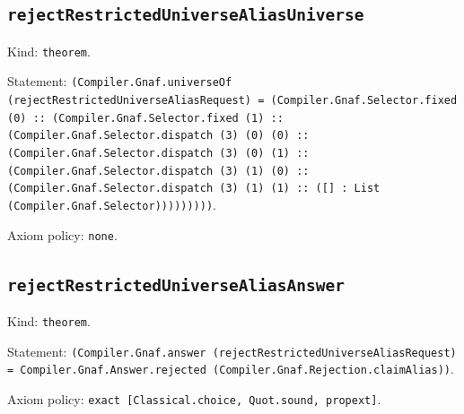 \documentclass[11pt]{article}
\begin{document}
\subsection*{\texttt{rejectRestrictedUniverseAliasUniverse}}
\noindent Kind: \texttt{theorem}.\par
\noindent Statement: \texttt{(Compiler.Gnaf.universeOf (rejectRestrictedUniverseAliasRequest) = (Compiler.Gnaf.Selector.fixed (0) :: (Compiler.Gnaf.Selector.fixed (1) :: (Compiler.Gnaf.Selector.dispatch (3) (0) (0) :: (Compiler.Gnaf.Selector.dispatch (3) (0) (1) :: (Compiler.Gnaf.Selector.dispatch (3) (1) (0) :: (Compiler.Gnaf.Selector.dispatch (3) (1) (1) :: ([] : List (Compiler.Gnaf.Selector)))))))))}.\par
\noindent Axiom policy: \texttt{none}.\par
\subsection*{\texttt{rejectRestrictedUniverseAliasAnswer}}
\noindent Kind: \texttt{theorem}.\par
\noindent Statement: \texttt{(Compiler.Gnaf.answer (rejectRestrictedUniverseAliasRequest) = Compiler.Gnaf.Answer.rejected (Compiler.Gnaf.Rejection.claimAlias))}.\par
\noindent Axiom policy: \texttt{exact [Classical.choice, Quot.sound, propext]}.\par
\end{document}
